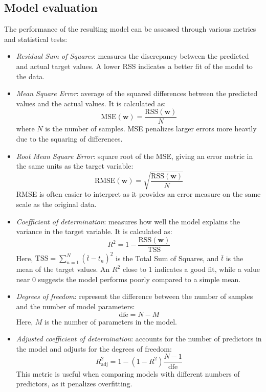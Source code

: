 \subsection{Model evaluation}
The performance of the resulting model can be assessed through various metrics and statistical tests:
\begin{itemize}
    \item \textit{Residual Sum of Squares}: measures the discrepancy between the predicted and actual target values.
        A lower RSS indicates a better fit of the model to the data.
    \item \textit{Mean Square Error}: average of the squared differences between the predicted values and the actual values. 
        It is calculated as:
        \[\text{MSE}(\mathbf{w})=\dfrac{\text{RSS}(\textbf{w})}{N}\]
        where $N$ is the number of samples. 
        MSE penalizes larger errors more heavily due to the squaring of differences.
    \item \textit{Root Mean Square Error}: square root of the MSE, giving an error metric in the same units as the target variable:
        \[\text{RMSE}(\mathbf{w})=\sqrt{\dfrac{\text{RSS}(\textbf{w})}{N}}\]
        RMSE is often easier to interpret as it provides an error measure on the same scale as the original data.
    \item \textit{Coefficient of determination}: measures how well the model explains the variance in the target variable. 
        It is calculated as:
        \[R^2=1-\dfrac{\text{RSS}(\mathbf{w})}{\text{TSS}}\]
        Here, $\text{TSS}=\sum_{n=1}^N(\bar{t}-t_n)^2$ is the Total Sum of Squares, and $\bar{t}$ is the mean of the target values.
        An $R^2$ close to 1 indicates a good fit, while a value near 0 suggests the model performs poorly compared to a simple mean.
    \item \textit{Degrees of freedom}: represent the difference between the number of samples and the number of model parameters:
        \[\text{dfe}=N-M\]
        Here, $M$ is the number of parameters in the model.
    \item \textit{Adjusted coefficient of determination}: accounts for the number of predictors in the model and adjusts for the degrees of freedom:
        \[R^2_{\text{adj}}=1-(1-R^2)\dfrac{N-1}{\text{dfe}}\]
        This metric is useful when comparing models with different numbers of predictors, as it penalizes overfitting.
\end{itemize}

